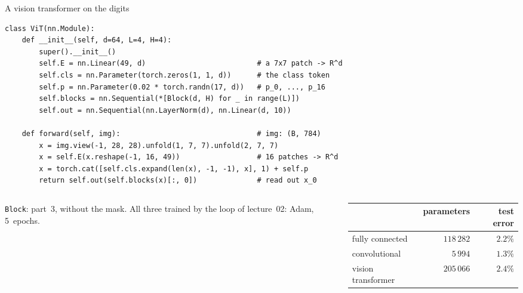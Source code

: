 \documentclass[10pt]{beamer}
\begin{document}
\begin{frame}[fragile]{A vision transformer on the digits}
\begin{lstlisting}
class ViT(nn.Module):
    def __init__(self, d=64, L=4, H=4):
        super().__init__()
        self.E = nn.Linear(49, d)                          # a 7x7 patch -> R^d
        self.cls = nn.Parameter(torch.zeros(1, 1, d))      # the class token
        self.p = nn.Parameter(0.02 * torch.randn(17, d))   # p_0, ..., p_16
        self.blocks = nn.Sequential(*[Block(d, H) for _ in range(L)])
        self.out = nn.Sequential(nn.LayerNorm(d), nn.Linear(d, 10))

    def forward(self, img):                                # img: (B, 784)
        x = img.view(-1, 28, 28).unfold(1, 7, 7).unfold(2, 7, 7)
        x = self.E(x.reshape(-1, 16, 49))                  # 16 patches -> R^d
        x = torch.cat([self.cls.expand(len(x), -1, -1), x], 1) + self.p
        return self.out(self.blocks(x)[:, 0])              # read out x_0
\end{lstlisting}
\footnotesize
\begin{columns}[c]
\begin{column}{0.36\textwidth}
\raggedright
\texttt{Block}: part~3, without the mask. All three trained by the loop of lecture~02: Adam, 5~epochs.
\end{column}
\begin{column}{0.62\textwidth}
\renewcommand{\arraystretch}{1.05}
\begin{tabular}{@{}l r r@{}}
\toprule
 & parameters & test error \\
\midrule
fully connected & $118\,282$ & $2.2\%$ \\
convolutional & $5\,994$ & $1.3\%$ \\
\alert{vision transformer} & $205\,066$ & $2.4\%$ \\
\bottomrule
\end{tabular}
\end{column}
\end{columns}
\end{frame}
\end{document}
